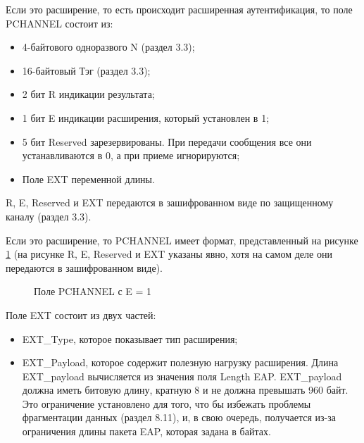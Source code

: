 Если это расширение, то есть происходит расширенная аутентификация, то поле PCHANNEL состоит из:

\begin{itemize}
\item 4-байтового одноразвого N (раздел 3.3);
\item 16-байтовый Тэг (раздел 3.3);
\item 2 бит R индикации результата;
\item 1 бит E индикации расширения, который установлен в 1;
\item 5 бит Reserved зарезервированы. При передачи сообщения все они устанавливаются в 0, а при приеме игнорируются;
\item Поле EXT переменной длины.
\end{itemize}

R, E, Reserved и EXT передаются в зашифрованном виде по защищенному каналу (раздел 3.3).

Если это расширение, то PCHANNEL имеет формат, представленный на рисунке \ref{img:ext_pchannel} (на рисунке R, E, Reserved и EXT указаны явно, хотя на самом деле они передаются в зашифрованном виде).

\begin{figure}[h!]
\caption{Поле PCHANNEL с E = 1}
\label{img:ext_pchannel}
\end{figure}

Поле EXT состоит из двух частей:

\begin{itemize}
\item EXT\_Type, которое показывает тип расширения;
\item EXT\_Payload, которое содержит полезную нагрузку расширения. Длина EXT\_payload вычисляется из значения поля Length EAP. EXT\_payload должна иметь битовую длину, кратную 8 и не должна превышать 960 байт. Это ограничение установлено для того, что бы избежать проблемы фрагментации данных (раздел 8.11), и, в свою очередь, получается из-за ограничения длины пакета EAP, которая задана в байтах.
\end{itemize}

